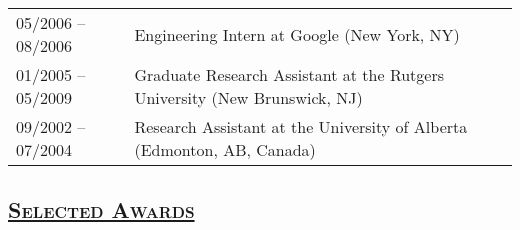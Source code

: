 \documentclass[10pt,twoside,letterpaper]{article}
\newcommand{\tabrowsep}{\vspace{1mm}}
\begin{document}
\begin{tabular}{p{30mm} p{120mm}}
05/2006 -- 08/2006 & Engineering Intern at Google (New York, NY) \\
01/2005 -- 05/2009 & Graduate Research Assistant at the Rutgers University (New Brunswick, NJ) \\
09/2002 -- 07/2004 & Research Assistant at the University of Alberta (Edmonton, AB, Canada) \\
\end{tabular}

\subsection*{\textsc{\underline{Selected Awards}}}
\end{document}
